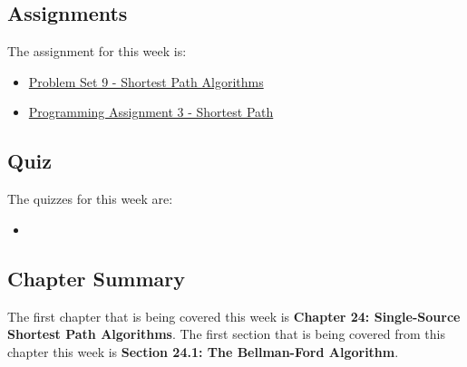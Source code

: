 \subsection{Assignments}

The assignment for this week is:

\begin{itemize}
    \item \href{https://github.com/QuantumCompiler/CU/tree/main/CSPB%203104%20-%20Algorithms/Assignments/Problem%20Sets/Problem%20Set%209%20-%20Shortest%20Path%20Algorithms}{Problem Set 9 - Shortest Path Algorithms}
    \item \href{https://github.com/QuantumCompiler/CU/tree/main/CSPB%203104%20-%20Algorithms/Assignments/Programming%20Assignments/Programming%20Assignment%203%20-%20Shortest%20Path}{Programming Assignment 3 - Shortest Path}
\end{itemize}

\subsection{Quiz}

The quizzes for this week are:

\begin{itemize}
    \item {}
\end{itemize}

\newpage

\subsection{Chapter Summary}

The first chapter that is being covered this week is \textbf{Chapter 24: Single-Source Shortest Path Algorithms}. The first section that is being covered from this chapter this week is \textbf{Section 24.1: The Bellman-Ford Algorithm}.

